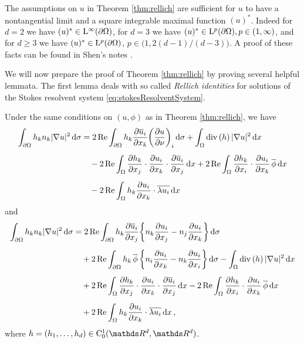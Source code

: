 \begin{rem}
  \label{rem:shenNontangential}
  The assumptions on $u$ in Theorem \ref{thm:rellich} are sufficient for $u$ to have a nontangential limit and a square integrable maximal function $(u)^*$. 
  Indeed for $d = 2$ we have $(u)^* \in \mathrm{L}^\infty(\partial\Omega)$, for $d = 3$ we have $(u)^* \in \mathrm{L}^p(\partial\Omega), p \in (1,\infty)$, and for $d \geq 3$ we have $(u)^* \in \mathrm{L}^p(\partial\Omega)$, $p \in \big(1, 2 (d - 1) / (d - 3) \big)$.
  A proof of these facts can be found in Shen's notes \cite[Prop.\@~7.1.3]{Shen2017}.
\end{rem}

We will now prepare the proof of Theorem \ref{thm:rellich} by proving several helpful lemmata.
The first lemma deals with so called \emph{Rellich identities} for solutions of the Stokes resolvent system \eqref{eq:stokesResolventSystem}.

\begin{lem}
  \label{lem:rellichIdentity}
  Under the same conditions on $(u,\phi)$ as in Theorem \ref{thm:rellich}, we have
  \begin{align}
    \int_{\partial\Omega} h_k n_k |\nabla u|^2 \, {\operatorname{d}\!{\sigma}} 
    &= 2 \operatorname{Re} \int_{\partial\Omega} h_k \frac{\partial \overline u_i}{\partial x_k} \bigg( \frac{\partial u}{\partial \nu} \bigg)_i \, {\operatorname{d}\!{\sigma}} + \int_\Omega \mathrm{div\,} (h)\, |\nabla u|^2 \, {\operatorname{d}\!{x}} \nonumber\\[0.5em]
    &\quad - 2 \operatorname{Re} \int_\Omega \frac{\partial h_k}{\partial x_j} \cdot \frac{\partial u_i}{\partial x_k} \cdot \frac{\partial \overline u_i}{\partial x_j} \, {\operatorname{d}\!{x}} + 2 \operatorname{Re} \int_\Omega \frac{\partial h_k}{\partial x_i} \cdot \frac{\partial u_i}{\partial x_k} \, \overline \phi \, {\operatorname{d}\!{x}} \nonumber\\[0.5em]
    &\quad - 2 \operatorname{Re} \int_\Omega h_k \frac{\partial u_i}{\partial x_k} \cdot \overline {\lambda u_i} \, {\operatorname{d}\!{x}} \label{eq:rellichIdentity}
  \end{align}
  and
  \begin{align}
    \int_{\partial\Omega} h_k n_k |\nabla u|^2 \, {\operatorname{d}\!{\sigma}}
    &= 2\operatorname{Re} \int_{\partial\Omega} h_k \frac{\partial \overline u_i}{\partial x_j} \bigg\{ n_k \frac{\partial u_i}{\partial x_j} - n_j \frac{\partial u_i}{\partial x_k} \bigg\} \, {\operatorname{d}\!{\sigma}} \nonumber\\[0.5em]
    &\quad + 2 \operatorname{Re} \int_{\partial\Omega} h_k \, \overline \phi \, \bigg\{ n_i \frac{\partial u_i}{\partial x_k} - n_k \frac{\partial u_i}{\partial x_i} \bigg\} \, {\operatorname{d}\!{\sigma}} - \int_\Omega \mathrm{div\,} (h)\, |\nabla u|^2 \, {\operatorname{d}\!{x}} \nonumber\\[0.5em]
    &\quad + 2 \operatorname{Re} \int_\Omega \frac{\partial h_k}{\partial x_j} \cdot \frac{\partial u_i}{\partial x_k} \cdot \frac{\partial \overline u_i}{\partial x_j} \, {\operatorname{d}\!{x}} - 2 \operatorname{Re} \int_\Omega \frac{\partial h_k}{\partial x_i} \cdot \frac{\partial u_i}{\partial x_k} \, \overline \phi \, {\operatorname{d}\!{x}} \nonumber\\[0.5em]
    &\quad + 2 \operatorname{Re} \int_\Omega h_k \frac{\partial u_i}{\partial x_k} \cdot \overline{ \lambda u_i} \, {\operatorname{d}\!{x}}\,, \label{eq:rellichIdentity2}
  \end{align}
  where $h = (h_1, \dots,h_d) \in \CC_0^1(\R^d, \R^d)$.
\end{lem}

